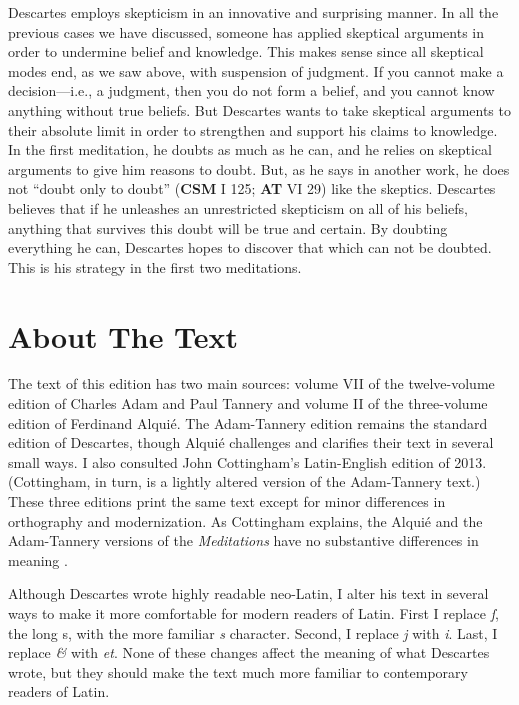 Descartes employs skepticism in an innovative and surprising manner. In all the previous cases we have discussed, someone has applied skeptical arguments in order to undermine belief and knowledge. This makes sense since all skeptical modes end, as we saw above, with suspension of judgment. If you cannot make a decision---i.e., a judgment, then you do not form a belief, and you cannot know anything without true beliefs. But Descartes wants to take skeptical arguments to their absolute limit in order to strengthen and support his claims to knowledge. In the first meditation, he doubts as much as he can, and he relies on skeptical arguments to give him reasons to doubt. But, as he says in another work, he does not ``doubt only to doubt'' (\textbf{CSM} I 125; \textbf{AT} VI 29) like the skeptics. Descartes believes that if he unleashes an unrestricted skepticism on all of his beliefs, anything that survives this doubt will be true and certain. By doubting everything he can, Descartes hopes to discover that which can not be doubted. This is his strategy in the first two meditations.

\section{About The Text}

The text of this edition has two main sources: volume VII of the twelve-volume edition of Charles Adam and Paul Tannery and volume II of the three-volume edition of Ferdinand Alquié. The Adam-Tannery edition remains the standard edition of Descartes, though Alquié challenges and clarifies their text in several small ways. I also consulted John Cottingham's Latin-English edition of 2013. (Cottingham, in turn, is a lightly altered version of the Adam-Tannery text.) These three editions print the same text except for minor differences in orthography and modernization. As Cottingham explains, the Alquié and the Adam-Tannery versions of the \textit{Meditations} have no substantive differences in meaning \parencite[xxxii, footnote 5]{cottingham2013}.

Although Descartes wrote highly readable neo-Latin, I alter his text in several ways to make it more comfortable for modern readers of Latin. First I replace  \textit{ſ}, the long s, with the more familiar \textit{s} character. Second, I replace \textit{j} with \textit{i}. Last, I replace \textit{\&} with \textit{et}. None of these changes affect the meaning of what Descartes wrote, but they should make the text much more familiar to contemporary readers of Latin.

